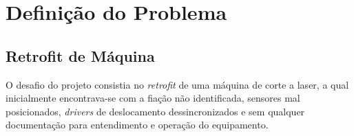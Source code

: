 \documentclass[
	article,			%
	11pt,				%
	oneside,			%
	a4paper,			%
	section=TITLE,		%
	english,			%
	brazil,				%
	sumario=tradicional
	]{abntex2}
\begin{document}
    



\newpage

\section{Definição do Problema}
\label{sec:intro}
\subsection{Retrofit de Máquina}
O desafio do projeto consistia no \textit{retrofit} de uma máquina de corte a laser, a qual inicialmente encontrava-se com a fiação não identificada, sensores mal posicionados, \textit{drivers} de deslocamento dessincronizados e sem qualquer documentação para entendimento e operação do equipamento.
\end{document}
